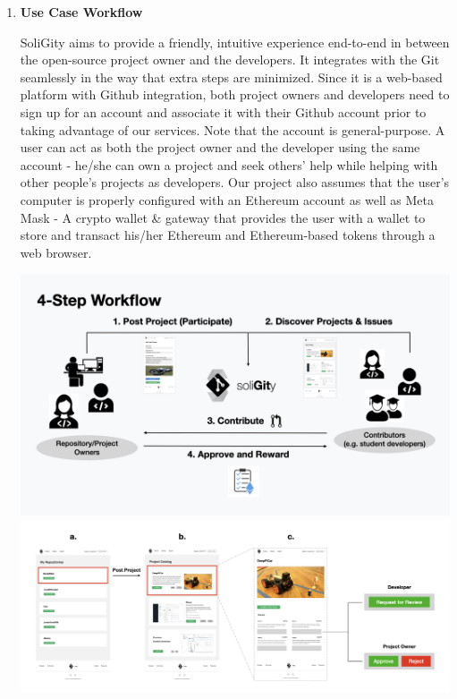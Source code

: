 \documentclass[12pt]{article}
\renewcommand{\_}{\kern-1.5pt\textunderscore\kern-1.5pt}
\begin{document}
\begin{enumerate}
	\item \textbf{Use Case Workflow} \par
    SoliGity aims to provide a friendly, intuitive experience end-to-end in between the open-source project owner and the developers. It integrates with the Git seamlessly in the way that extra steps are minimized. Since it is a web-based platform with Github integration, both project owners and developers need to sign up for an account and associate it with their Github account prior to taking advantage of our services. Note that the account is general-purpose. A user can act as both the project owner and the developer using the same account - he/she can own a project and seek others’ help while helping with other people’s projects as developers. Our project also assumes that the user’s computer is properly configured with an Ethereum account as well as Meta Mask - A crypto wallet & gateway that provides the user with a wallet to store and transact his/her Ethereum and Ethereum-based tokens through a web browser. 
    
     \includegraphics[width=16cm]{graphs/00a. workflow.jpeg}\\
     \includegraphics[width=16cm]{graphs/00b. workflow.jpeg}
    
	      \begin{enumerate}
	      

\end{enumerate}
\end{enumerate}
\end{document}
